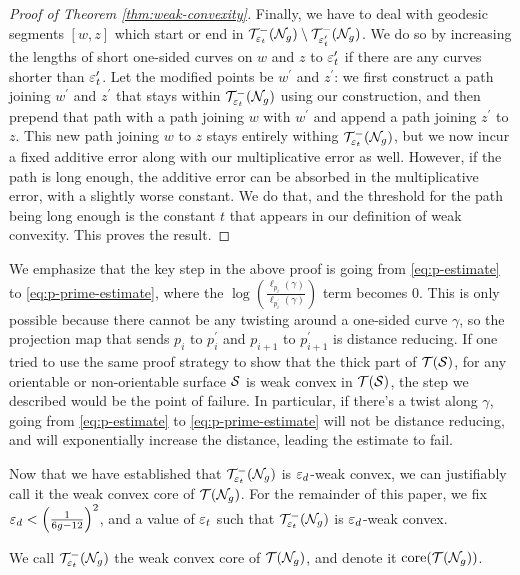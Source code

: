 \begin{proof}[Proof of Theorem \ref{thm:weak-convexity}]
  Finally, we have to deal with geodesic segments $[w,z]$ which start or end in $\mathcal{T}_{\varepsilon_t}^{-}(\mathcal{N}_g) \setminus \mathcal{T}_{\varepsilon_t^{\prime}}^{-}(\mathcal{N}_g)$.
  We do so by increasing the lengths of short one-sided curves on $w$ and $z$ to $\varepsilon_t^{\prime}$ if there are any curves shorter than $\varepsilon_t^{\prime}$.
  Let the modified points be $w^{\prime}$ and $z^{\prime}$: we first construct a path joining $w^{\prime}$ and $z^{\prime}$ that stays within $\mathcal{T}_{\varepsilon_t}^{-}(\mathcal{N}_g)$ using our construction, and then prepend that path with a path joining $w$ with $w^{\prime}$ and append a path joining $z^{\prime}$ to $z$.
  This new path joining $w$ to $z$ stays entirely withing $\mathcal{T}_{\varepsilon_t}^{-}(\mathcal{N}_g)$, but we now incur a fixed additive error along with our multiplicative error as well.
  However, if the path is long enough, the additive error can be absorbed in the multiplicative error, with a slightly worse constant.
  We do that, and the threshold for the path being long enough is the constant $t$ that appears in our definition of weak convexity.
  This proves the result.
\end{proof}

\begin{remark}
  We emphasize that the key step in the above proof is going from \eqref{eq:p-estimate} to \eqref{eq:p-prime-estimate}, where the $\log\left( \frac{\ell_{p_i}(\gamma)}{\ell_{p_i^{\prime}}(\gamma)}  \right)$ term becomes $0$.
  This is only possible because there cannot be any twisting around a one-sided curve $\gamma$, so the projection map that sends $p_i$ to $p_i^{\prime}$ and $p_{i+1}$ to $p_{i+1}^{\prime}$ is distance reducing.
  If one tried to use the same proof strategy to show that the thick part of $\mathcal{T}(\mathcal{S})$, for any orientable or non-orientable surface $\mathcal{S}$ is weak convex in $\mathcal{T}(\mathcal{S})$, the step we described would be the point of failure.
  In particular, if there's a twist along $\gamma$, going from \eqref{eq:p-estimate} to \eqref{eq:p-prime-estimate} will not be distance reducing, and will exponentially increase the distance, leading the estimate to fail.
\end{remark}

Now that we have established that $\mathcal{T}_{\varepsilon_t}^{-}(\mathcal{N}_g)$ is $\varepsilon_d$-weak convex, we can justifiably call it the weak convex core of $\mathcal{T}(\mathcal{N}_g)$.
For the remainder of this paper, we fix $\varepsilon_d < \left(  \frac{1}{6g-12} \right)^2$, and a value of $\varepsilon_t$ such that $\mathcal{T}_{\varepsilon_t}^{-}(\mathcal{N}_g)$ is $\varepsilon_d$-weak convex.

\begin{definition}
  We call $\mathcal{T}_{\varepsilon_t}^{-}(\mathcal{N}_g)$ the weak convex core of $\mathcal{T}(\mathcal{N}_g)$, and denote it $\mathrm{core}(\mathcal{T}(\mathcal{N}_g))$.
\end{definition}

